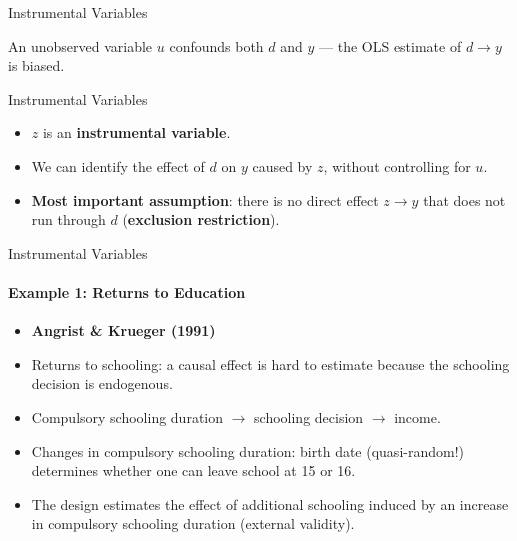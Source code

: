 \documentclass[11pt,aspectratio=169]{beamer}
\begin{document}
\begin{frame}{Instrumental Variables}
  \centering
  \vspace{0.3em}
  \footnotesize An unobserved variable $u$ confounds both $d$ and $y$ --- the OLS estimate of $d \to y$ is biased.
\end{frame}

\begin{frame}{Instrumental Variables}
  \centering
  \vspace{0.5em}
  \begin{itemize}
    \item $z$ is an \textbf{instrumental variable}.
    \item We can identify the effect of $d$ on $y$ caused by $z$, without controlling for $u$.
    \item \textbf{Most important assumption}: there is no direct effect $z \to y$ that does not run through $d$ (\textbf{exclusion restriction}).
  \end{itemize}
\end{frame}

\begin{frame}{Instrumental Variables}
  \framesubtitle{Example 1: Returns to Education}
  \begin{itemize}
    \item \textbf{Angrist \& Krueger (1991)}
    \item Returns to schooling: a causal effect is hard to estimate because the schooling decision is endogenous.
    \item Compulsory schooling duration $\to$ schooling decision $\to$ income.
    \item Changes in compulsory schooling duration: birth date (quasi-random!) determines whether one can leave school at 15 or 16.
    \item The design estimates the effect of additional schooling induced by an increase in compulsory schooling duration (external validity).
  \end{itemize}
\end{frame}
\end{document}

